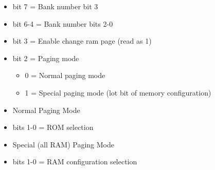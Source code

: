 \begin{itemize}
\item bit 7 = Bank number bit 3
\item bit 6-4 = Bank number bits 2-0
\item bit 3 = Enable change ram page (read as 1)
\item bit 2 = Paging mode
\begin{itemize}
\item 0 = Normal paging mode
\item 1 = Special paging mode (lot bit of memory configuration)
\end{itemize}
\item[] Normal Paging Mode
\item bits 1-0 = ROM selection
\item[] Special (all RAM) Paging Mode
\item bits 1-0 = RAM configuration selection
\end{itemize}
